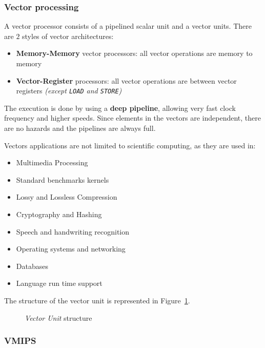 \documentclass[english]{article}
\begin{document}
\subsubsection{Vector processing}

A vector processor consists of a pipelined scalar unit and a vector units.
There are \(2\) styles of vector architectures:

\begin{itemize}
  \item \textbf{Memory-Memory} vector processors: all vector operations are memory to memory
  \item \textbf{Vector-Register} processors: all vector operations are between vector registers \textit{(except \texttt{LOAD} and \texttt{STORE})}
\end{itemize}

The execution is done by using a \textbf{deep pipeline}, allowing very fast clock frequency and higher speeds.
Since elements in the vectors are independent, there are no hazards and the pipelines are always full.

Vectors applications are not limited to scientific computing, as they are used in:

\begin{itemize}
  \item Multimedia Processing
  \item Standard benchmarks kernels
  \item Lossy and Lossless Compression
  \item Cryptography and Hashing
  \item Speech and handwriting recognition
  \item Operating systems and networking
  \item Databases
  \item Language run time support
\end{itemize}

The structure of the vector unit is represented in Figure~\ref{fig:vector-unit-structure}.

\begin{figure}
  \bigskip
  \centering
  \caption{\textit{Vector Unit} structure}
  \label{fig:vector-unit-structure}
  \bigskip
\end{figure}

\subsubsection{VMIPS}
\end{document}
